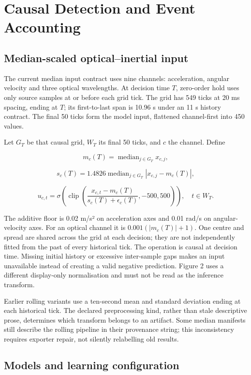 \section{Causal Detection and Event Accounting}\label{causal-detection-and-event-accounting}

\subsection{Median-scaled optical--inertial input}\label{median-scaled-opticalinertial-input}

The current median input contract uses nine channels: acceleration, angular velocity and three optical wavelengths. At decision time \(T\), zero-order hold uses only source samples at or before each grid tick. The grid has 549 ticks at 20 ms spacing, ending at \(T\); its first-to-last span is 10.96 s under an 11 s history contract. The final 50 ticks form the model input, flattened channel-first into 450 values.

Let \(G_T\) be that causal grid, \(W_T\) its final 50 ticks, and \(c\) the channel. Define

\[
m_c(T)=\operatorname{median}_{j\in G_T}x_{c,j},
\]

\[
s_c(T)=1.4826\operatorname{median}_{j\in G_T}|x_{c,j}-m_c(T)|,
\]

\[
u_{c,t}=\sigma\left(\operatorname{clip}\left(\frac{x_{c,t}-m_c(T)}{s_c(T)+\epsilon_c(T)},-500,500\right)\right),\quad t\in W_T.
\]

The additive floor is 0.02 m/s² on acceleration axes and 0.01 rad/s on angular-velocity axes. For an optical channel it is \(0.001(|m_c(T)|+1)\). One centre and spread are shared across the grid at each decision; they are not independently fitted from the past of every historical tick. The operation is causal at decision time. Missing initial history or excessive inter-sample gaps makes an input unavailable instead of creating a valid negative prediction. Figure 2 uses a different display-only normalisation and must not be read as the inference transform.

Earlier rolling variants use a ten-second mean and standard deviation ending at each historical tick. The declared preprocessing kind, rather than stale descriptive prose, determines which transform belongs to an artifact. Some median manifests still describe the rolling pipeline in their provenance string; this inconsistency requires exporter repair, not silently relabelling old results.

\subsection{Models and learning configuration}\label{models-and-learning-configuration}

